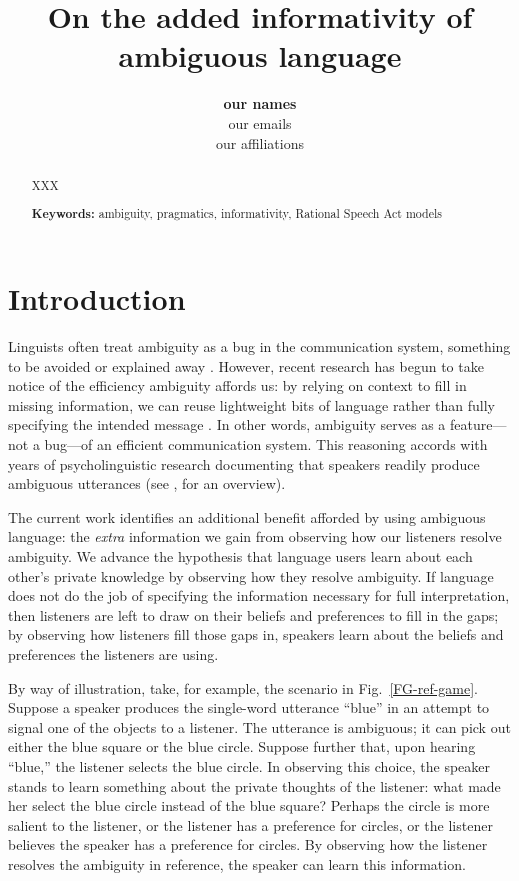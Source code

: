 \documentclass[10pt,a4paper]{article}
\title{On the added informativity of ambiguous language}
\author{\large \textbf{our names}\\
our emails\\
our affiliations}
\begin{document}
\maketitle

\begin{abstract}
XXX


\textbf{Keywords:} 
ambiguity, pragmatics, informativity, Rational Speech Act models

\end{abstract}

\section{Introduction}

Linguists often treat ambiguity as a bug in the communication system, something to be avoided or explained away \cite{grice1975,chomsky2002minimalism}. However, recent research has begun to take notice of the efficiency ambiguity affords us: by relying on context to fill in missing information, we can reuse lightweight bits of language rather than fully specifying the intended message \cite{levinson2000,piantadosietal2012,wasow2015}. In other words, ambiguity serves as a feature---not a bug---of an efficient communication system. This reasoning accords with years of psycholinguistic research documenting that speakers readily produce ambiguous utterances (see , for an overview). 

The current work identifies an additional benefit afforded by using ambiguous language: the \emph{extra} information we gain from observing how our listeners resolve ambiguity. We advance the hypothesis that language users learn about each other's private knowledge by observing how they resolve ambiguity. If language does not do the job of specifying the information necessary for full interpretation, then listeners are left to draw on their beliefs and preferences to fill in the gaps; by observing how listeners fill those gaps in, speakers learn about the beliefs and preferences the listeners are using. 

By way of illustration, take, for example, the scenario in Fig.~\ref{FG-ref-game}. Suppose a speaker produces the single-word utterance ``blue'' in an attempt to signal one of the objects to a listener. The utterance is ambiguous; it can pick out either the blue square or the blue circle. Suppose further that, upon hearing ``blue,'' the listener selects the blue circle. In observing this choice, the speaker stands to learn something about the private thoughts of the listener: what made her select the blue circle instead of the blue square? Perhaps the circle is more salient to the listener, or the listener has a preference for circles, or the listener believes the speaker has a preference for circles. By observing how the listener resolves the ambiguity in reference, the speaker can learn this information. 
\end{document}
